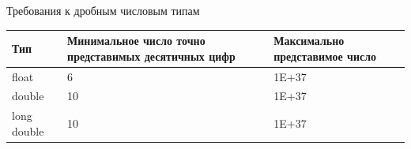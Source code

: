 \documentclass[unknownkeysallowed,xcolor=table]{beamer}
\begin{document}
\begin{frame}[fragile]{Требования к дробным числовым типам}
  \centering
  \begin{tabular}{|C{8em}|C{8em}|C{8em}|}
    \hline
    \bfseries Тип & \bfseries Минимальное число точно представимых десятичных цифр & \bfseries Максимально представимое число \\
    \hline
    float & 6 & 1E+37 \\
    double & 10 & 1E+37 \\
    long double & 10 & 1E+37 \\
    \hline
  \end{tabular}
\end{frame}
\end{document}
